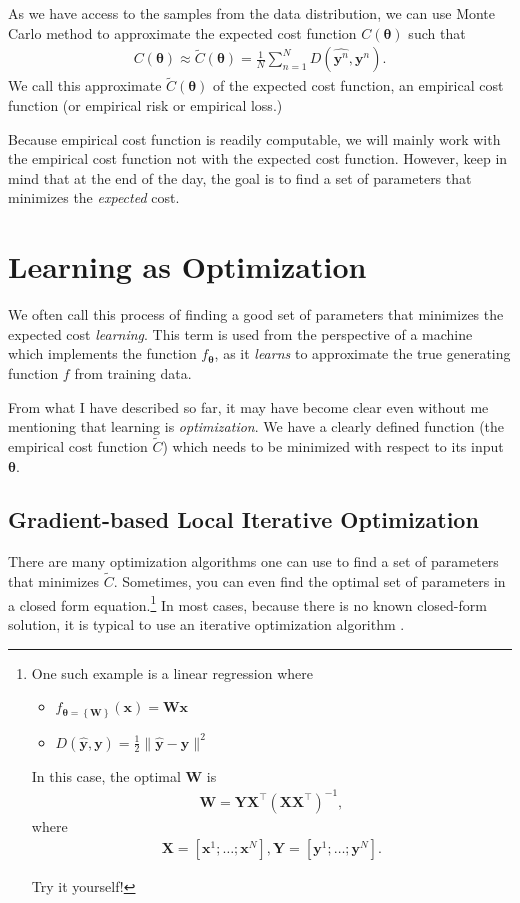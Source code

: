 \documentclass{report}
\newcommand{\vect}[1]{\mathbf{#1}}
\newcommand{\vects}[1]{\boldsymbol{#1}}
\newcommand{\matr}[1]{\mathbf{#1}}
\newcommand{\vx}[0]{\vect{x}}
\newcommand{\vy}[0]{\vect{y}}
\newcommand{\mW}[0]{\matr{W}}
\newcommand{\mX}[0]{\matr{X}}
\newcommand{\mY}[0]{\matr{Y}}
\newcommand{\TT}[0]{\vects{\theta}}
\begin{document}
As we have access to the samples from the data distribution, we can use Monte
Carlo method to approximate the expected cost function $C(\TT)$ such that
\begin{align}
    \label{eq:empirical_cost}
    C(\TT) \approx \tilde{C}(\TT) = \frac{1}{N} \sum_{n=1}^N D(\hat{\vy^{n}},
    \vy^{n}).
\end{align}
We call this approximate $\tilde{C}(\TT)$ of the expected cost function, an
empirical cost function (or empirical risk or empirical loss.)

Because empirical cost function is readily computable, we will mainly work with
the empirical cost function not with the expected cost function. However, keep
in mind that at the end of the day, the goal is to find a set of parameters that
minimizes the {\em expected} cost.


\section{Learning as Optimization}

We often call this process of finding a good set of parameters that minimizes
the expected cost {\em learning}. This term is used from the perspective of a
machine which implements the function $f_{\TT}$, as it {\em learns} to
approximate the true generating function $f$ from training data.

From what I have described so far, it may have become clear even without me
mentioning that learning is {\em optimization}. We have a clearly defined
function (the empirical cost function $\tilde{C}$) which needs to be minimized
with respect to its input $\TT$.

\subsection{Gradient-based Local Iterative Optimization}
There are many optimization algorithms one can use to find a set of parameters
that minimizes $\tilde{C}$. Sometimes, you can even find the optimal set of
parameters in a closed form equation.\footnote{
    One such example is a linear regression where 
    \begin{itemize}
        \item $f_{\TT=\left\{ \mW\right\}}(\vx) = \mW \vx$
        \item $D(\hat{\vy}, \vy) = \frac{1}{2} \| \hat{\vy} - \vy \|^2$
    \end{itemize}
    In this case, the optimal $\mW$ is 
    \begin{align}
        \label{eq:opt_lin}
        \mW = \mY \mX^\top (\mX \mX^\top)^{-1},
    \end{align}
    where
    \begin{align*}
        \mX = \left[ \vx^1; \ldots ;\vx^N\right], \mY = \left[ \vy^1; \ldots ;\vy^N\right]. 
    \end{align*}

    Try it yourself! 
}
In most cases, because there is no known closed-form solution, it is typical to
use an iterative optimization algorithm \citep[see][for in-depth
discussion on optimization.]{Fletcher1987}.
\end{document}
